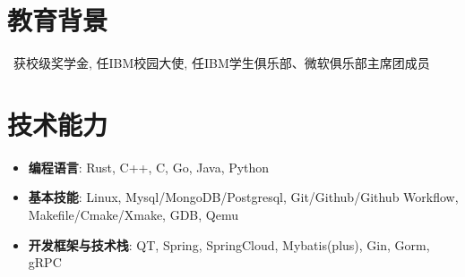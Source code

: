 \documentclass{resume}
\begin{document}



\section{教育背景}
\ 获校级奖学金, 任IBM校园大使, 任IBM学生俱乐部、微软俱乐部主席团成员

\section{技术能力}
\begin{itemize}[parsep=0.2ex]
  \item \textbf{编程语言}: Rust, C++, C, Go, Java, Python
  \item \textbf{基本技能}: Linux, Mysql/MongoDB/Postgresql, Git/Github/Github Workflow, Makefile/Cmake/Xmake, GDB, Qemu
  \item \textbf{开发框架与技术栈}: QT, Spring, SpringCloud, Mybatis(plus), Gin, Gorm, gRPC
\end{itemize}

\end{document}

